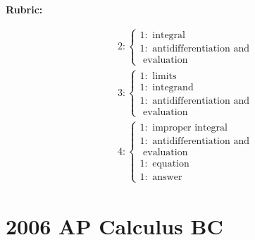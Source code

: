 \documentclass[12pt,addpoints,answers]{exam}
\begin{document}
\begin{questions}
\begin{solution}
\par\medskip
\textbf{Rubric:}\par
\[\begin{aligned}
& 2:\left\{\begin{array}{c}
1: \text { integral } \\
1: \text { antidifferentiation and } \\
\text { evaluation }
\end{array}\right. \\
& 3:\left\{\begin{array}{r}
1: \text { limits } \\
1: \text { integrand } \\
1: \text { antidifferentiation and } \\
\text { evaluation }
\end{array}\right. \\
& 4:\left\{\begin{array}{l}
1: \text { improper integral } \\
1: \text { antidifferentiation and } \\
\text { evaluation } \\
1: \text { equation } \\
1: \text { answer }
\end{array}\right.
\end{aligned}\]
\end{solution}

\end{questions}

\section*{2006 AP Calculus BC}
\end{document}
